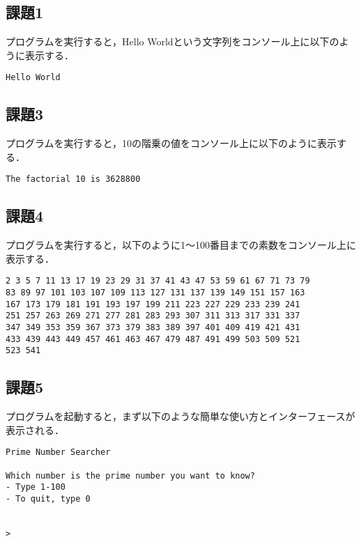 \documentclass[a4j]{jarticle}
\begin{document}
\subsection{課題1}

プログラムを実行すると，Hello Worldという文字列をコンソール上に以下のように表示する．

{\baselineskip 3mm
\begin{verbatim}
Hello World
\end{verbatim}
}


\subsection{課題3}

プログラムを実行すると，10の階乗の値をコンソール上に以下のように表示する．

{\baselineskip 3mm
\begin{verbatim}
The factorial 10 is 3628800
\end{verbatim}
}


\subsection{課題4}

プログラムを実行すると，以下のように1〜100番目までの素数をコンソール上に表示する．  

{\baselineskip 3mm
\begin{verbatim}
2 3 5 7 11 13 17 19 23 29 31 37 41 43 47 53 59 61 67 71 73 79 
83 89 97 101 103 107 109 113 127 131 137 139 149 151 157 163 
167 173 179 181 191 193 197 199 211 223 227 229 233 239 241 
251 257 263 269 271 277 281 283 293 307 311 313 317 331 337 
347 349 353 359 367 373 379 383 389 397 401 409 419 421 431 
433 439 443 449 457 461 463 467 479 487 491 499 503 509 521 
523 541 
\end{verbatim}
}


\subsection{課題5}

プログラムを起動すると，まず以下のような簡単な使い方とインターフェースが表示される．

{\baselineskip 3mm
\begin{verbatim}
Prime Number Searcher

Which number is the prime number you want to know?
- Type 1-100
- To quit, type 0


> 
\end{verbatim}
}
\end{document}
